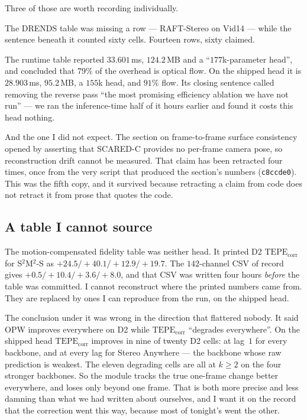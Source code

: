 \documentclass[11pt,a4paper]{article}
\providecommand{\TEPE}{\mathrm{TEPE}}
\begin{document}
Three of those are worth recording individually.

The DRENDS table was missing a row --- RAFT-Stereo on Vid14 --- while the
sentence beneath it counted sixty cells. Fourteen rows, sixty claimed.

The runtime table reported $33.601$\,ms, $124.2$\,MB and a ``$177$k-parameter
head'', and concluded that $79\%$ of the overhead is optical flow. On the
shipped head it is $28.903$\,ms, $95.2$\,MB, a $155$k head, and $91\%$ flow.
Its closing sentence called removing the reverse pass ``the most promising
efficiency ablation we have not run'' --- we ran the inference-time half of it
hours earlier and found it costs this head nothing.

And the one I did not expect. The section on frame-to-frame surface
consistency opened by asserting that SCARED-C provides no per-frame camera
pose, so reconstruction drift cannot be measured. That claim has been retracted
four times, once from the very script that produced the section's numbers
(\texttt{c8ccde0}). This was the fifth copy, and it survived because retracting
a claim from code does not retract it from prose that quotes the code.

\subsection*{A table I cannot source}

The motion-compensated fidelity table was neither head. It printed D2
$\TEPE_{\mathrm{corr}}$ for S$^2$M$^2$-S as $+24.5/+40.1/+12.9/+19.7$. The
$142$-channel CSV of record gives $+0.5/+10.4/+3.6/+8.0$, and that CSV was
written four hours \emph{before} the table was committed. I cannot reconstruct
where the printed numbers came from. They are replaced by ones I can reproduce
from the run, on the shipped head.

The conclusion under it was wrong in the direction that flattered nobody. It
said OPW improves everywhere on D2 while $\TEPE_{\mathrm{corr}}$ ``degrades
everywhere''. On the shipped head $\TEPE_{\mathrm{corr}}$ improves in nine of
twenty D2 cells: at lag~$1$ for every backbone, and at every lag for Stereo
Anywhere --- the backbone whose raw prediction is weakest. The eleven
degrading cells are all at $k\geq2$ on the four stronger backbones. So the
module tracks the true one-frame change better everywhere, and loses only
beyond one frame. That is both more precise and less damning than what we had
written about ourselves, and I want it on the record that the correction went
this way, because most of tonight's went the other.
\end{document}
